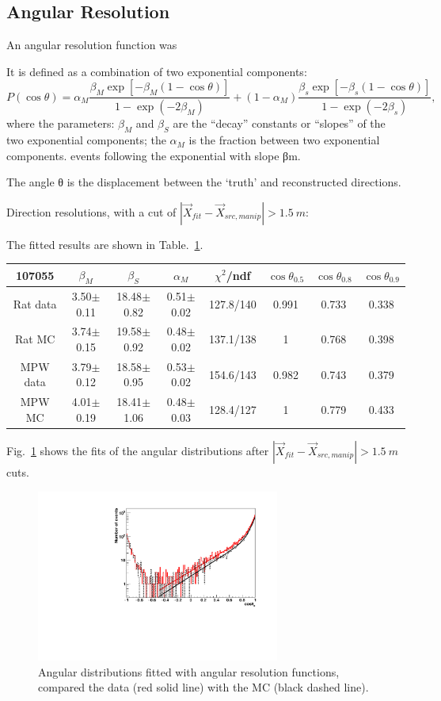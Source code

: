 \subsection{Angular Resolution}
An angular resolution function was 

It is defined as a combination of two exponential components:
\begin{equation}
P(\cos\theta)=\alpha_M\frac{\beta_M\exp[-\beta_M(1-\cos\theta)]}{1-\exp(-2\beta_M)}+(1-\alpha_M)\frac{\beta_s\exp[-\beta_s(1-\cos\theta)]}{1-\exp(-2\beta_s)},
\end{equation}
where the parameters: $\beta_M$ and $\beta_S$ are the ``decay'' constants or ``slopes'' of the two exponential components; the $\alpha_M$ is the fraction between two exponential components.
events following the exponential with slope βm. 


The angle θ is the displacement between the ‘truth’ and
reconstructed directions.

Direction resolutions, with a cut of $|\vec{X}_{fit}-\vec{X}_{src,manip}|>1.5~m$:

The fitted results are shown in Table.~\ref{angularResolValues}.
\begin{table}[ht]
	\begin{tabular}{cccccccc}%
		\toprule
		107055& $\beta_M$ &  $\beta_S$ & $\alpha_M$ & $\chi^2$/ndf & $\cos\theta_{0.5}$ & $\cos\theta_{0.8}$& $\cos\theta_{0.9}$\\
		\hline
		Rat data & 3.50$\pm$0.11 & 18.48$\pm$0.82 & 0.51$\pm$0.02 & 127.8/140 & 0.991 & 0.733 & 0.338\\
		Rat MC  & 3.74$\pm$0.15 & 19.58$\pm$0.92 & 0.48$\pm$0.02 & 137.1/138 & 1 & 0.768 & 0.398\\	
		\hline
		MPW data & 3.79$\pm$0.12 & 18.58$\pm$0.95 & 0.53$\pm$0.02 & 154.6/143 & 0.982 & 0.743 & 0.379\\
		MPW MC &4.01$\pm$0.19 & 18.41$\pm$1.06 & 0.48$\pm$0.03 & 128.4/127 & 1 & 0.779 & 0.433  \\
		\bottomrule
	\end{tabular}
	\label{angularResolValues}
\end{table}


Fig.~\ref{angularResolMPW} shows the fits of the angular distributions after $|\vec{X}_{fit}-\vec{X}_{src,manip}|>1.5~m$ cuts.
\begin{figure}
	\centering
	\includegraphics[width=8cm]{angularResol_107055_mpw.pdf}
	\caption{Angular distributions fitted with angular resolution functions, compared the data (red solid line) with the MC (black dashed line).}
	\label{angularResolMPW}
\end{figure}


